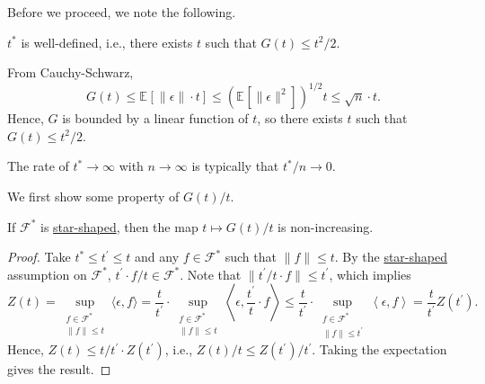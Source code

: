 Before we proceed, we note the following.

\begin{remark}
	\(t^{\ast} \) is well-defined, i.e., there exists \(t\) such that \(G(t) \leq t^2 / 2\).
\end{remark}
\begin{explanation}
	From Cauchy-Schwarz,
	\[
		G(t) \leq \mathbb{E}_{}\left[ \lVert \epsilon \rVert \cdot t \right] \leq (\mathbb{E}_{}\left[ \lVert \epsilon \rVert ^2 \right] )^{1 / 2} t \leq \sqrt{n} \cdot t.
	\]
	Hence, \(G\) is bounded by a linear function of \(t\), so there exists \(t\) such that \(G(t) \leq t^2 / 2\).
\end{explanation}

\begin{remark}
	The rate of \(t^{\ast} \to \infty \) with \(n \to \infty \) is typically that \(t^{\ast} / n \to 0\).
\end{remark}

We first show some property of \(G(t) / t\).

\begin{lemma}\label{lma:lec26-non-increasing}
	If \(\mathscr{F} ^{\ast} \) is \hyperref[def:star-shaped]{star-shaped}, then the map \(t \mapsto G(t) / t\) is non-increasing.
\end{lemma}
\begin{proof}
	Take \(t^{\ast} \leq t^{\prime} \leq t\) and any \(f \in \mathscr{F} ^{\ast} \) such that \(\lVert f \rVert \leq t\). By the \hyperref[def:star-shaped]{star-shaped} assumption on \(\mathscr{F} ^{\ast} \), \(t^{\prime} \cdot f / t \in \mathscr{F} ^{\ast}\). Note that \(\lVert t^{\prime} / t \cdot f \rVert \leq t^{\prime} \), which implies
	\[
		Z(t)
		= \sup _{\substack{f\in \mathscr{F} ^{\ast} \\ \lVert f \rVert \leq t}}\langle \epsilon , f \rangle
		= \frac{t}{t^{\prime} } \cdot \sup _{\substack{f\in \mathscr{F} ^{\ast} \\ \lVert f \rVert \leq t}} \left\langle \epsilon , \frac{t^{\prime} }{t} \cdot f\right\rangle
		\leq \frac{t}{t^{\prime} } \cdot \sup _{\substack{f\in \mathscr{F} ^{\ast} \\ \lVert f \rVert \leq t^{\prime} }} \left\langle \epsilon , f \right\rangle
		= \frac{t}{t^{\prime} } Z(t^{\prime} ).
	\]
	Hence, \(Z(t) \leq t / t^{\prime} \cdot Z(t^{\prime} )\), i.e., \(Z(t) / t \leq Z(t^{\prime} ) / t^{\prime} \). Taking the expectation gives the result.
\end{proof}

